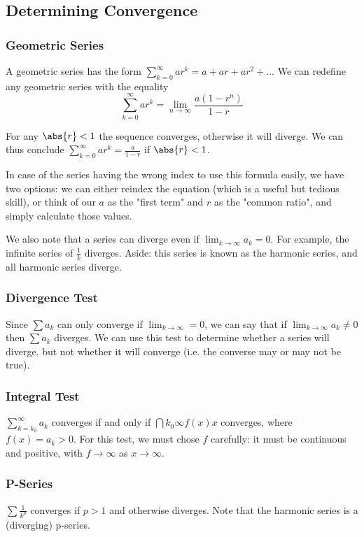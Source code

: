 \documentclass[12pt]{article}
\begin{document}
\subsection*{Determining Convergence}
\subsubsection*{Geometric Series}
A geometric series has the form $\displaystyle\sum_{k=0}^\infty ar^k = a + ar + ar^2 + ...$ We can redefine any geometric series with the equality  \[ \sum_{k=0}^\infty ar^k = \lim_{n\to\infty} \frac{a(1-r^n)}{1-r} \]

For any $\abs{r} < 1$ the sequence converges, otherwise it will diverge. We can thus conclude $\displaystyle\sum_{k=0}^\infty ar^k = \frac{a}{1-r}$ if $\abs{r} < 1$.

In case of the series having the wrong index to use this formula easily, we have two options: we can either reindex the equation (which is a useful but tedious skill), or think of our $a$ as the "first term" and $r$ as the "common ratio", and simply calculate those values.

We also note that a series can diverge even if $\displaystyle\lim_{k\to\infty} a_k = 0$. For example, the infinite series of $\frac{1}{k}$ diverges. Aside: this series is known as the harmonic series, and all harmonic series diverge.

\subsubsection*{Divergence Test}
Since $\sum a_k$ can only converge if $\displaystyle\lim_{k\to\infty} = 0$, we can say that if $\displaystyle\lim_{k\to\infty} a_k \neq 0$ then $\sum a_k$ diverges. We can use this test to determine whether a series will diverge, but not whether it will converge (i.e. the converse may or may not be true).

\subsubsection*{Integral Test}
$\displaystyle\sum_{k=k_0}^\infty a_k$ converges if and only if $\dint{k_0}{\infty}{f(x)}{x}$ converges, where $f(x) = a_k > 0$. For this test, we must chose $f$ carefully: it must be continuous and positive, with $f \to \infty$ as $x \to \infty$.

\subsubsection*{P-Series}
$\sum \frac{1}{k^p}$ converges if $p > 1$ and otherwise diverges. Note that the harmonic series is a (diverging) p-series.
\end{document}
